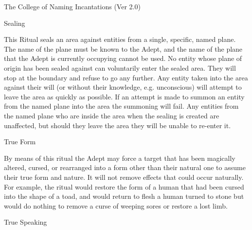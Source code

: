 \begin{Chapter}{The College of Naming Incantations (Ver 2.0)}
\begin{ritual}[R-5]{Sealing}
\begin{effects}
This Ritual seals an area against entities from a single, specific,
named plane. The name of the plane must be known to the Adept, and the
name of the plane that the Adept is currently occupying cannot be
used.  No entity whose plane of origin has been sealed against can
voluntarily enter the sealed area. They will stop at the boundary and
refuse to go any further.  Any entity taken into the area against
their will (or without their knowledge, e.g.  unconscious) will
attempt to leave the area as quickly as possible.  If an attempt is
made to summon an entity from the named plane into the area the
summoning will fail.  Any entities from the named plane who are inside
the area when the sealing is created are unaffected, but should they
leave the area they will be unable to re-enter it.
\end{effects}
\end{ritual}

\begin{ritual}[R-6]{True Form}
\begin{effects}
By means of this ritual the Adept may force a target that has been
magically altered, cursed, or rearranged into a form other than their
natural one to assume their true form and nature. It will not remove
effects that could occur naturally.  For example, the ritual would
restore the form of a human that had been cursed into the shape of a
toad, and would return to flesh a human turned to stone but would do
nothing to remove a curse of weeping sores or restore a lost limb.
\end{effects}
\end{ritual}

\begin{ritual}[R-7]{True Speaking}


\end{ritual}
\end{Chapter}
